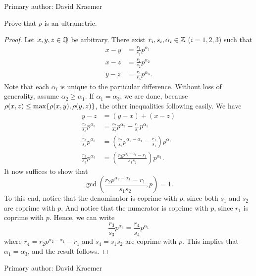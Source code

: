Primary author: David Kraemer


\begin{majorEx}
    Prove that $\rho$ is an ultrametric.
\end{majorEx}

\begin{proof}
    Let $x, y, z \in \mathbb{Q}$ be arbitrary. There exist $r_i, s_i, \alpha_i \in \mathbb{Z}$
    ($i = 1, 2, 3$) such that
    \begin{align*}
        x - y &= \frac{r_1}{s_1} p^{\alpha_1} \\
        x - z &= \frac{r_2}{s_2} p^{\alpha_2} \\
        y - z &= \frac{r_3}{s_3} p^{\alpha_3}.
    \end{align*}
    Note that each $\alpha_i$ is unique to the particular difference.
    Without loss of generality, assume $\alpha_2 \geq \alpha_1$. If $\alpha_1 =
    \alpha_3$, we are done, because $\rho(x,z) \leq \max\{\rho(x,y), \rho(y,z)\}$,
    the other inequalities following easily. We have
    \begin{align*}
        y - z &= (y - x) + (x - z) \\
        \frac{r_3}{s_3}p^{\alpha_3} &= \frac{r_2}{s_2} p^{\alpha_2} -
        \frac{r_1}{s_1} p^{\alpha_1} \\
        \frac{r_3}{s_3}p^{\alpha_3} &= \left(\frac{r_2}{s_2} p^{\alpha_2 -
        \alpha_1} - \frac{r_1}{s_1} \right) p^{\alpha_1} \\
        \frac{r_3}{s_3}p^{\alpha_3} &= \left(\frac{r_2p^{\alpha_2 -
        \alpha_1} - r_1}{s_1s_2} \right) p^{\alpha_1}.
     \end{align*}
     It now suffices to show that 
     \[
         \gcd \left(\frac{r_2p^{\alpha_2 - \alpha_1} - r_1}{s_1s_2},
         p \right) = 1.
     \]
     To this end, notice that the denominator is coprime with $p$, since both
     $s_1$ and $s_2$ are coprime with $p$. And notice that the numerator is
     coprime with $p$, since $r_1$ is coprime with $p$. Hence, we can write
     \[
         \frac{r_3}{s_3}p^{\alpha_3} = \frac{r_4}{s_4} p^{\alpha_1}
     \]
     where $r_4 = r_2 p^{\alpha_2 - \alpha_1} - r_1$ and $s_4 = s_1 s_2$ are
     coprime with $p$. This implies that $\alpha_1 = \alpha_3$, and the result
     follows.
\end{proof}

Primary author: David Kraemer
